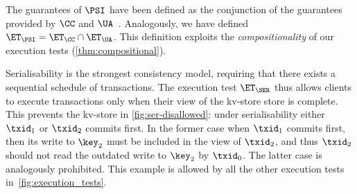 The guarantees of $\PSI$ have been defined as the conjunction of the guarantees provided by $\CC$ and $\UA$~\cite{framework-concur}.
Analogously, we have defined $\ET_\PSI = \ET_\CC \cap \ET_\UA$. 
This definition exploits the \emph{compositionality} of our execution tests (\cref{thm:compositional}).

Serialisability is the strongest consistency model, requiring that there exists a sequential schedule of transactions. 
The execution test $\ET_{\SER}$ thus allows clients to execute transactions only when 
their view of the kv-store store is complete.
This prevents the kv-store in  \cref{fig:ser-disallowed}: under serialisability either $\txid_1$ or $\txid_2$ commits first.
In the former case when $\txid_1$ commits first, then its write to $\key_2$ must be included in the view of $\txid_2$, and thus $\txid_2$ should not read the outdated write to $\key_2$ by $\txid_0$. 
The latter case is analogously prohibited. 
This example is allowed by all the other execution tests in~\cref{fig:execution_tests}.

